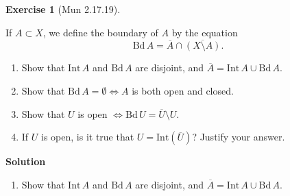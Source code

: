 \documentclass[
]{book}
\providecommand{\tightlist}{%
  \setlength{\itemsep}{0pt}\setlength{\parskip}{0pt}}
\theoremstyle{definition}
\theoremstyle{definition}
\theoremstyle{definition}
\newtheorem{exercise}{Exercise}[chapter]
\theoremstyle{definition}
\theoremstyle{remark}
\begin{document}
\begin{exercise}[Mun 2.17.19]
\protect\hypertarget{exr:unnamed-chunk-175}{}\label{exr:unnamed-chunk-175}

If \(A \subset X\), we define the boundary of \(A\) by the equation
\[\text{Bd} \, A = \overline{A} \cap \overline{(X \setminus A)}.\]

\begin{enumerate}
\def\labelenumi{(\alph{enumi})}
\tightlist
\item
  Show that \(\text{Int} \, A\) and \(\text{Bd} \, A\) are disjoint, and \(\overline{A} = \text{Int} \, A \cup \text{Bd} \, A\).
\item
  Show that \(\text{Bd} \, A = \emptyset \Leftrightarrow A\) is both open and closed.
\item
  Show that \(U\) is open \(\Leftrightarrow \text{Bd} \, U = \overline{U} \setminus U\).
\item
  If \(U\) is open, is it true that \(U = \text{Int}(\overline{U})\)? Justify your answer.
\end{enumerate}

\end{exercise}

\textbf{Solution}

\begin{enumerate}
\def\labelenumi{(\alph{enumi})}
\tightlist
\item
  Show that \(\text{Int} \, A\) and \(\text{Bd} \, A\) are disjoint, and \(\overline{A} = \text{Int} \, A \cup \text{Bd} \, A\).
\end{enumerate}
\end{document}
